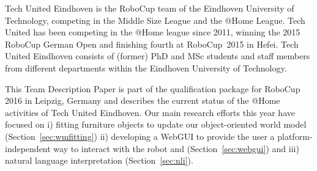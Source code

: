 Tech United Eindhoven is the RoboCup team of the Eindhoven University of Technology, competing in the Middle Size League and the @Home League. Tech United has been competing in the @Home league since 2011, winning the 2015 RoboCup German Open and finishing fourth at RoboCup~2015 in Hefei. 
Tech United Eindhoven consists of (former) PhD and MSc students and staff members from different departments within the Eindhoven University of Technology.

This Team Description Paper is part of the qualification package for RoboCup 2016 in Leipzig, Germany and describes the current status of the @Home activities of Tech United Eindhoven.
Our main research efforts this year have focused on i) fitting furniture objects to update our object-oriented world model (Section~\ref{sec:wmfitting}) ii) developing a WebGUI to provide the user a platform-independent way to interact with the robot and (Section~\ref{sec:webgui}) and iii) natural language interpretation (Section~\ref{sec:nli}).   
